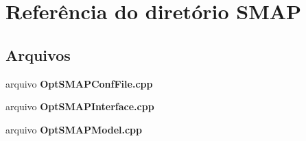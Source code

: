 \section{Referência do diretório S\+M\+AP}
\label{dir_f367d20558ee551b89d6ce2f85aadbec}
\subsection*{Arquivos}
\begin{DoxyCompactItemize}
\item 
arquivo {\bf Opt\+S\+M\+A\+P\+Conf\+File.\+cpp}
\item 
arquivo {\bf Opt\+S\+M\+A\+P\+Interface.\+cpp}
\item 
arquivo {\bf Opt\+S\+M\+A\+P\+Model.\+cpp}
\end{DoxyCompactItemize}
